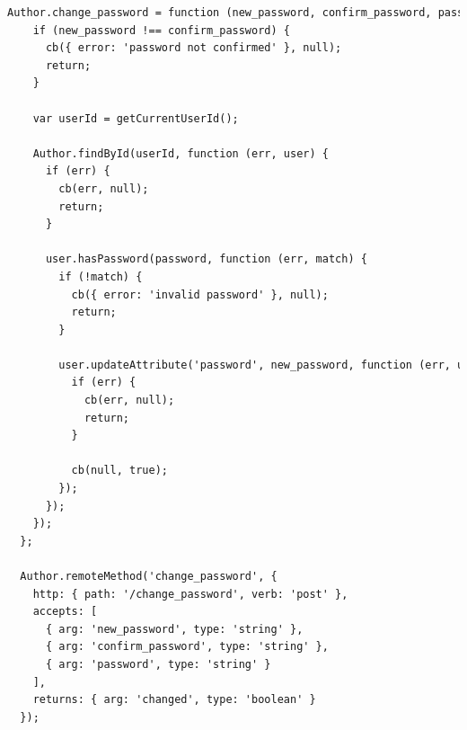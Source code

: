 \begin{lstlisting}[language=html]
Author.change_password = function (new_password, confirm_password, password, cb) {
    if (new_password !== confirm_password) {
      cb({ error: 'password not confirmed' }, null);
      return;
    }

    var userId = getCurrentUserId();  

    Author.findById(userId, function (err, user) {
      if (err) {
        cb(err, null);
        return;
      }

      user.hasPassword(password, function (err, match) {
        if (!match) {
          cb({ error: 'invalid password' }, null);
          return;
        }

        user.updateAttribute('password', new_password, function (err, user) {
          if (err) {
            cb(err, null);
            return;
          }

          cb(null, true);
        });
	  });       
    });
  };
   
  Author.remoteMethod('change_password', {
    http: { path: '/change_password', verb: 'post' },
    accepts: [
      { arg: 'new_password', type: 'string' },
      { arg: 'confirm_password', type: 'string' },
      { arg: 'password', type: 'string' }
    ],
    returns: { arg: 'changed', type: 'boolean' }
  });
\end{lstlisting}



